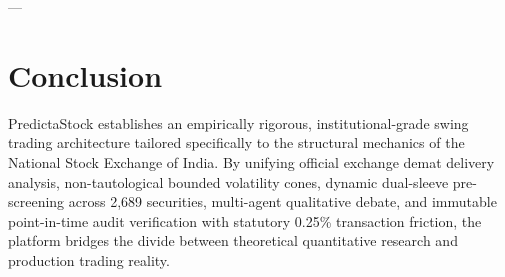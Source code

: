 \documentclass[11pt,a4paper]{article}
\begin{document}
---

\section{Conclusion}

PredictaStock establishes an empirically rigorous, institutional-grade swing trading architecture tailored specifically to the structural mechanics of the National Stock Exchange of India. By unifying official exchange demat delivery analysis, non-tautological bounded volatility cones, dynamic dual-sleeve pre-screening across 2,689 securities, multi-agent qualitative debate, and immutable point-in-time audit verification with statutory 0.25\% transaction friction, the platform bridges the divide between theoretical quantitative research and production trading reality.
\end{document}
